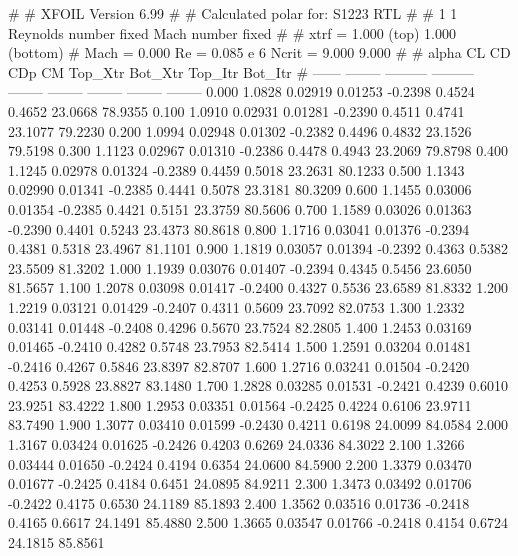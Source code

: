 #  
#       XFOIL         Version 6.99
#  
# Calculated polar for: S1223 RTL                                       
#  
# 1 1 Reynolds number fixed          Mach number fixed         
#  
# xtrf =   1.000 (top)        1.000 (bottom)  
# Mach =   0.000     Re =     0.085 e 6     Ncrit =   9.000  9.000
#  
#   alpha    CL        CD       CDp       CM     Top_Xtr  Bot_Xtr  Top_Itr  Bot_Itr
#  ------ -------- --------- --------- -------- -------- -------- -------- --------
   0.000   1.0828   0.02919   0.01253  -0.2398   0.4524   0.4652  23.0668  78.9355
   0.100   1.0910   0.02931   0.01281  -0.2390   0.4511   0.4741  23.1077  79.2230
   0.200   1.0994   0.02948   0.01302  -0.2382   0.4496   0.4832  23.1526  79.5198
   0.300   1.1123   0.02967   0.01310  -0.2386   0.4478   0.4943  23.2069  79.8798
   0.400   1.1245   0.02978   0.01324  -0.2389   0.4459   0.5018  23.2631  80.1233
   0.500   1.1343   0.02990   0.01341  -0.2385   0.4441   0.5078  23.3181  80.3209
   0.600   1.1455   0.03006   0.01354  -0.2385   0.4421   0.5151  23.3759  80.5606
   0.700   1.1589   0.03026   0.01363  -0.2390   0.4401   0.5243  23.4373  80.8618
   0.800   1.1716   0.03041   0.01376  -0.2394   0.4381   0.5318  23.4967  81.1101
   0.900   1.1819   0.03057   0.01394  -0.2392   0.4363   0.5382  23.5509  81.3202
   1.000   1.1939   0.03076   0.01407  -0.2394   0.4345   0.5456  23.6050  81.5657
   1.100   1.2078   0.03098   0.01417  -0.2400   0.4327   0.5536  23.6589  81.8332
   1.200   1.2219   0.03121   0.01429  -0.2407   0.4311   0.5609  23.7092  82.0753
   1.300   1.2332   0.03141   0.01448  -0.2408   0.4296   0.5670  23.7524  82.2805
   1.400   1.2453   0.03169   0.01465  -0.2410   0.4282   0.5748  23.7953  82.5414
   1.500   1.2591   0.03204   0.01481  -0.2416   0.4267   0.5846  23.8397  82.8707
   1.600   1.2716   0.03241   0.01504  -0.2420   0.4253   0.5928  23.8827  83.1480
   1.700   1.2828   0.03285   0.01531  -0.2421   0.4239   0.6010  23.9251  83.4222
   1.800   1.2953   0.03351   0.01564  -0.2425   0.4224   0.6106  23.9711  83.7490
   1.900   1.3077   0.03410   0.01599  -0.2430   0.4211   0.6198  24.0099  84.0584
   2.000   1.3167   0.03424   0.01625  -0.2426   0.4203   0.6269  24.0336  84.3022
   2.100   1.3266   0.03444   0.01650  -0.2424   0.4194   0.6354  24.0600  84.5900
   2.200   1.3379   0.03470   0.01677  -0.2425   0.4184   0.6451  24.0895  84.9211
   2.300   1.3473   0.03492   0.01706  -0.2422   0.4175   0.6530  24.1189  85.1893
   2.400   1.3562   0.03516   0.01736  -0.2418   0.4165   0.6617  24.1491  85.4880
   2.500   1.3665   0.03547   0.01766  -0.2418   0.4154   0.6724  24.1815  85.8561

